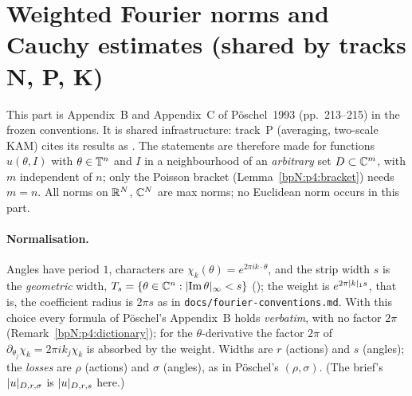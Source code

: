 \section{Weighted Fourier norms and Cauchy estimates (shared by tracks N, P, K)}\label{bpN:p4}
\providecommand{\wn}[3]{\lvert #1\rvert_{#2,#3}}
\providecommand{\Dom}[2]{\mathcal D_{#1,#2}}
\providecommand{\Os}[2]{\mathcal O(#1,#2)}
\begingroup\sloppy

This part is Appendix~B and Appendix~C of P\"oschel~1993 (pp.~213--215) in the frozen conventions. It is shared infrastructure: track~P
(averaging, two-scale KAM) cites its results as . The statements are therefore made for functions $u(\theta,I)$ with
$\theta\in\mathbb{T}^n$ and $I$ in a neighbourhood of an \emph{arbitrary} set $D\subset\mathbb{C}^m$, with $m$ independent of $n$; only the Poisson bracket
(Lemma~\ref{bpN:p4:bracket}) needs $m=n$. All norms on $\mathbb{R}^N$, $\mathbb{C}^N$ are max norms; no Euclidean norm occurs in this part.

\paragraph{Normalisation.} Angles have period $1$, characters are $\chi_k(\theta)=e^{2\pi ik\cdot\theta}$, and the strip width $s$ is the
\emph{geometric} width, $T_s=\{\theta\in\mathbb{C}^n:\lvert \operatorname{Im}\theta\rvert_\infty<s\}$ (); the weight is $e^{2\pi\lvert k\rvert_1s}$, that is, the
coefficient radius is $2\pi s$ as in \texttt{docs/fourier-conventions.md}. With this choice every formula of P\"oschel's Appendix~B
holds \emph{verbatim}, with no factor $2\pi$ (Remark~\ref{bpN:p4:dictionary}); for the $\theta$-derivative the factor $2\pi$ of $\partial_{\theta_j}\chi_k=2\pi ik_j\chi_k$ is
absorbed by the weight. Widths are $r$ (actions) and $s$ (angles); the \emph{losses} are $\rho$ (actions) and $\sigma$ (angles), as in P\"oschel's
$(\rho,\sigma)$. (The brief's $\lvert u\rvert_{D,r,\sigma}$ is $\lvert u\rvert_{D,r,s}$ here.)


